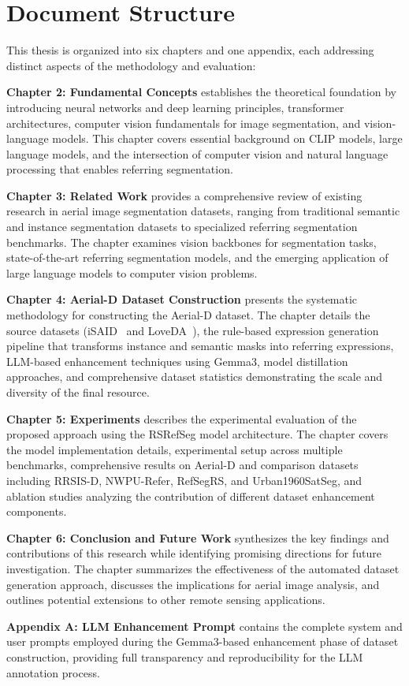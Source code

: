 \section{Document Structure}

This thesis is organized into six chapters and one appendix, each addressing distinct aspects of the methodology and evaluation:

\textbf{Chapter 2: Fundamental Concepts} establishes the theoretical foundation by introducing neural networks and deep learning principles, transformer architectures, computer vision fundamentals for image segmentation, and vision-language models. This chapter covers essential background on CLIP models, large language models, and the intersection of computer vision and natural language processing that enables referring segmentation.

\textbf{Chapter 3: Related Work} provides a comprehensive review of existing research in aerial image segmentation datasets, ranging from traditional semantic and instance segmentation datasets to specialized referring segmentation benchmarks. The chapter examines vision backbones for segmentation tasks, state-of-the-art referring segmentation models, and the emerging application of large language models to computer vision problems.

\textbf{Chapter 4: Aerial-D Dataset Construction} presents the systematic methodology for constructing the Aerial-D dataset. The chapter details the source datasets (iSAID~\cite{zamir2019isaid} and LoveDA~\cite{wang2021loveda}), the rule-based expression generation pipeline that transforms instance and semantic masks into referring expressions, LLM-based enhancement techniques using Gemma3, model distillation approaches, and comprehensive dataset statistics demonstrating the scale and diversity of the final resource.

\textbf{Chapter 5: Experiments} describes the experimental evaluation of the proposed approach using the RSRefSeg model architecture. The chapter covers the model implementation details, experimental setup across multiple benchmarks, comprehensive results on Aerial-D and comparison datasets including RRSIS-D, NWPU-Refer, RefSegRS, and Urban1960SatSeg, and ablation studies analyzing the contribution of different dataset enhancement components.

\textbf{Chapter 6: Conclusion and Future Work} synthesizes the key findings and contributions of this research while identifying promising directions for future investigation. The chapter summarizes the effectiveness of the automated dataset generation approach, discusses the implications for aerial image analysis, and outlines potential extensions to other remote sensing applications.

\textbf{Appendix A: LLM Enhancement Prompt} contains the complete system and user prompts employed during the Gemma3-based enhancement phase of dataset construction, providing full transparency and reproducibility for the LLM annotation process.